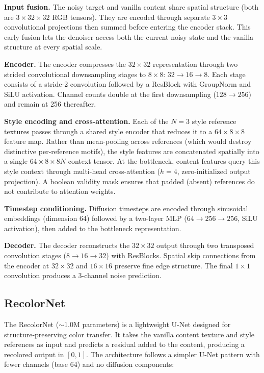 \textbf{Input fusion.} The noisy target and vanilla content share spatial structure (both are $3 \times 32 \times 32$ RGB tensors). They are encoded through separate $3\times3$ convolutional projections then summed before entering the encoder stack. This early fusion lets the denoiser access both the current noisy state and the vanilla structure at every spatial scale.

\textbf{Encoder.} The encoder compresses the $32\times32$ representation through two strided convolutional downsampling stages to $8\times8$: $32 \rightarrow 16 \rightarrow 8$. Each stage consists of a stride-2 convolution followed by a ResBlock with GroupNorm and SiLU activation. Channel counts double at the first downsampling ($128 \rightarrow 256$) and remain at 256 thereafter.

\textbf{Style encoding and cross-attention.} Each of the $N=3$ style reference textures passes through a shared style encoder that reduces it to a $64 \times 8 \times 8$ feature map. Rather than mean-pooling across references (which would destroy distinctive per-reference motifs), the style features are concatenated spatially into a single $64 \times 8 \times 8N$ context tensor. At the bottleneck, content features query this style context through multi-head cross-attention ($h=4$, zero-initialized output projection). A boolean validity mask ensures that padded (absent) references do not contribute to attention weights.

\textbf{Timestep conditioning.} Diffusion timesteps are encoded through sinusoidal embeddings (dimension 64) followed by a two-layer MLP ($64 \rightarrow 256 \rightarrow 256$, SiLU activation), then added to the bottleneck representation.

\textbf{Decoder.} The decoder reconstructs the $32\times32$ output through two transposed convolution stages ($8 \rightarrow 16 \rightarrow 32$) with ResBlocks. Spatial skip connections from the encoder at $32\times32$ and $16\times16$ preserve fine edge structure. The final $1\times1$ convolution produces a 3-channel noise prediction.

\subsection{RecolorNet}

The RecolorNet ($\sim$1.0M parameters) is a lightweight U-Net designed for structure-preserving color transfer. It takes the vanilla content texture and style references as input and predicts a residual added to the content, producing a recolored output in $[0,1]$. The architecture follows a simpler U-Net pattern with fewer channels (base 64) and no diffusion components:

